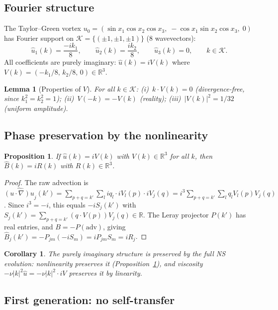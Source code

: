 \documentclass[11pt]{article}
\newtheorem{lemma}[theorem]{Lemma}
\newtheorem{proposition}[theorem]{Proposition}
\newtheorem{corollary}[theorem]{Corollary}
\theoremstyle{definition}
\newcommand{\R}{\mathbb{R}}
\newcommand{\cK}{\mathcal{K}}
\begin{document}
\subsection{Fourier structure}

The Taylor--Green vortex
$u_0 = (\sin x_1\cos x_2\cos x_3,\;
-\cos x_1\sin x_2\cos x_3,\;0)$
has Fourier support on $\cK = \{(\pm 1,\pm 1,\pm 1)\}$
(8 wavevectors):
\begin{equation}\label{eq:TG-fourier}
\hat u_1(k) = \frac{-ik_1}{8},\qquad
\hat u_2(k) = \frac{ik_2}{8},\qquad
\hat u_3(k) = 0,\qquad k\in\cK.
\end{equation}
All coefficients are purely imaginary:
$\hat u(k) = iV(k)$ where
$V(k) = (-k_1/8,\,k_2/8,\,0) \in \R^3$.

\begin{lemma}[Properties of $V$]
\label{lem:TG-imag}
For all $k\in\cK$: (i)~$k\cdot V(k) = 0$
(divergence-free, since $k_1^2=k_2^2=1$);
(ii)~$V(-k)=-V(k)$ (reality);
(iii)~$|V(k)|^2 = 1/32$ (uniform amplitude).
\end{lemma}

\subsection{Phase preservation by the nonlinearity}

\begin{proposition}
\label{prop:phase-preserve}
If $\hat u(k)=iV(k)$ with $V(k)\in\R^3$ for all $k$,
then $\hat B(k)=iR(k)$ with $R(k)\in\R^3$.
\end{proposition}

\begin{proof}
The raw advection is
$\widehat{(u\cdot\nabla)u}_j(k')
= \sum_{p+q=k'}\sum_l iq_l\cdot iV_l(p)\cdot iV_j(q)
= i^3\sum_{p+q=k'}\sum_l q_lV_l(p)V_j(q)$.
Since $i^3=-i$, this equals $-iS_j(k')$ with
$S_j(k') = \sum_{p+q=k'}(q\cdot V(p))V_j(q)\in\R$.
The Leray projector $P(k')$ has real entries, and
$B = -P(\text{adv})$, giving
$\hat B_j(k') = -P_{jm}(-iS_m) = iP_{jm}S_m = iR_j$.
\end{proof}

\begin{corollary}\label{cor:persistence}
The purely imaginary structure is preserved by the full NS
evolution: nonlinearity preserves it
(Proposition~\ref{prop:phase-preserve}), and viscosity
$-\nu|k|^2\hat u = -\nu|k|^2\cdot iV$ preserves it by
linearity.
\end{corollary}

\subsection{First generation: no self-transfer}
\end{document}
